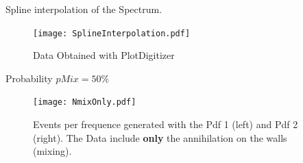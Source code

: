 \documentclass[9pt]{beamer}
\begin{document}
\begin{frame}{Spline interpolation of the Spectrum.}
\begin{figure}[hbtp]
\centering
\texttt{[image: SplineInterpolation.pdf]}
\caption{Data Obtained with PlotDigitizer}
\end{figure}
\end{frame}

\begin{frame}{ Probability $pMix = 50 \% $}
\begin{figure}[hbtp]
\centering
\texttt{[image: NmixOnly.pdf]}
\caption{Events per frequence generated with the Pdf 1 (left) and Pdf 2 (right). \newline The Data include \textbf{only} the annihilation on the walls (mixing).}
\end{figure}
\end{frame}
\end{document}
